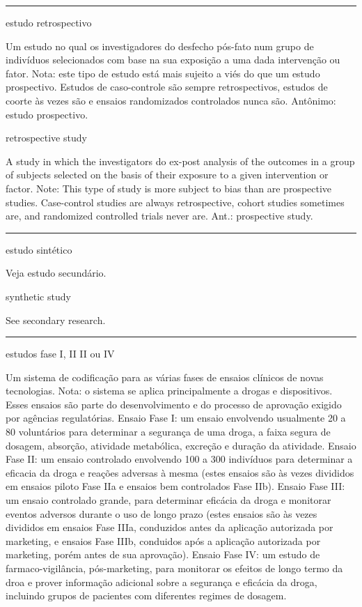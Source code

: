 \documentclass[
]{book}
\begin{document}
\begin{center}\rule{0.5\linewidth}{0.5pt}\end{center}

estudo retrospectivo

Um estudo no qual os investigadores do desfecho pós-fato num grupo de indivíduos selecionados com base na sua exposição a uma dada intervenção ou fator. Nota: este tipo de estudo está mais sujeito a viés do que um estudo prospectivo. Estudos de caso-controle são sempre retrospectivos, estudos de coorte às vezes são e ensaios randomizados controlados nunca são. Antônimo: estudo prospectivo.

retrospective study

A study in which the investigators do ex-post analysis of the outcomes in a group of subjects selected on the basis of their exposure to a given intervention or factor. Note: This type of study is more subject to bias than are prospective studies. Case-control studies are always retrospective, cohort studies sometimes are, and randomized controlled trials never are. Ant.: prospective study.

\begin{center}\rule{0.5\linewidth}{0.5pt}\end{center}

estudo sintético

Veja estudo secundário.

synthetic study

See secondary research.

\begin{center}\rule{0.5\linewidth}{0.5pt}\end{center}

estudos fase I, II II ou IV

Um sistema de codificação para as várias fases de ensaios clínicos de novas tecnologias. Nota: o sistema se aplica principalmente a drogas e dispositivos. Esses ensaios são parte do desenvolvimento e do processo de aprovação exigido por agências regulatórias. Ensaio Fase I: um ensaio envolvendo usualmente 20 a 80 voluntários para determinar a segurança de uma droga, a faixa segura de dosagem, absorção, atividade metabólica, excreção e duração da atividade. Ensaio Fase II: um ensaio controlado envolvendo 100 a 300 indivíduos para determinar a eficacia da droga e reações adversas à mesma (estes ensaios são às vezes divididos em ensaios piloto Fase IIa e ensaios bem controlados Fase IIb). Ensaio Fase III: um ensaio controlado grande, para determinar eficácia da droga e monitorar eventos adversos durante o uso de longo prazo (estes ensaios são às vezes divididos em ensaios Fase IIIa, conduzidos antes da aplicação autorizada por marketing, e ensaios Fase IIIb, conduidos após a aplicação autorizada por marketing, porém antes de sua aprovação). Ensaio Fase IV: um estudo de farmaco-vigilância, pós-marketing, para monitorar os efeitos de longo termo da droa e prover informação adicional sobre a segurança e eficácia da droga, incluindo grupos de pacientes com diferentes regimes de dosagem.
\end{document}

